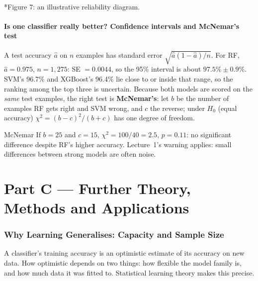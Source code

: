 \documentclass[11pt]{article}
\begin{document}
\begin{center}\\*{\small\color{GreyN}Figure 7: an illustrative reliability diagram.}\end{center}

\subsection{Is one classifier really better? Confidence intervals and McNemar's test}
A test accuracy $\hat a$ on $n$ examples has standard error $\sqrt{\hat a(1-\hat a)/n}$. For RF, $\hat a=0.975$, $n=1{,}275$: SE $=0.0044$, so the 95\% interval is about $97.5\%\pm0.9\%$. SVM's 96.7\% and XGBoost's 96.4\% lie close to or inside that range, so the ranking among the top three is uncertain. Because both models are scored on the \emph{same} test examples, the right test is \textbf{McNemar's}: let $b$ be the number of examples RF gets right and SVM wrong, and $c$ the reverse; under $H_0$ (equal accuracy) $\chi^2=(b-c)^2/(b+c)$ has one degree of freedom.
\begin{example}{McNemar}
If $b=25$ and $c=15$, $\chi^2=100/40=2.5$, $p=0.11$: no significant difference despite RF's higher accuracy. Lecture~1's warning applies: small differences between strong models are often noise.
\end{example}

\clearpage
\part*{Part C --- Further Theory, Methods and Applications}

\section{Why Learning Generalises: Capacity and Sample Size}
A classifier's training accuracy is an optimistic estimate of its accuracy on new data. How optimistic depends on two things: how flexible the model family is, and how much data it was fitted to. Statistical learning theory makes this precise.
\end{document}
